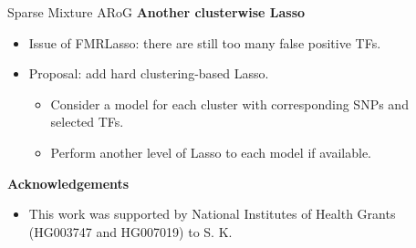 \documentclass[final]{beamer}
\newcommand{\bi}{\begin{itemize}}
\newcommand{\ei}{\end{itemize}}
\newcommand{\dis}{\displaystyle}
\begin{document}
\begin{frame}{}
\begin{columns}[t]
\begin{column}{1\linewidth}
\begin{columns}
\begin{column}{.26\textwidth}
\begin{block}{Sparse Mixture ARoG}
{\color{orange!100} \textbf{Another clusterwise Lasso}}
\bi
\item Issue of FMRLasso: there are still too many false positive TFs.
\item Proposal: add hard clustering-based Lasso.
\bi
\item Consider a model for each cluster with corresponding SNPs and selected TFs.
\item Perform another level of Lasso to each model if available.
\ei
\ei
{\textbf{Acknowledgements}}\\
\centering       
{\footnotesize
\bi
\item[] This work was supported by National Institutes of Health Grants (HG003747 and HG007019) to S. K.
\ei
}
\end{block}
\end{column}

\begin{column}{.33\textwidth}

\end{column}
\end{columns}
\end{column}
\end{columns}
\end{frame}
\end{document}
